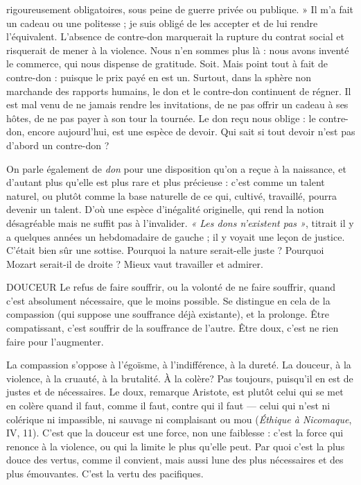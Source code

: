 rigoureusement obligatoires, sous peine de guerre privée ou publique. » Il m’a
fait un cadeau ou une politesse ; je suis obligé de les accepter et de lui rendre
l'équivalent. L'absence de contre-don marquerait la rupture du contrat social et
risquerait de mener à la violence. Nous n’en sommes plus là : nous avons
inventé le commerce, qui nous dispense de gratitude. Soit. Mais point tout à
fait de contre-don : puisque le prix payé en est un. Surtout, dans la sphère non
marchande des rapports humains, le don et le contre-don continuent de régner.
Il est mal venu de ne jamais rendre les invitations, de ne pas offrir un cadeau à
ses hôtes, de ne pas payer à son tour la tournée. Le don reçu nous oblige : le
contre-don, encore aujourd’hui, est une espèce de devoir. Qui sait si tout
devoir n’est pas d’abord un contre-don ?

On parle également de {\it don} pour une disposition qu’on a reçue à la naissance,
et d'autant plus qu’elle est plus rare et plus précieuse : c’est comme un
talent naturel, ou plutôt comme la base naturelle de ce qui, cultivé, travaillé,
pourra devenir un talent. D'où une espèce d’inégalité originelle, qui rend la
notion désagréable mais ne suffit pas à l’invalider. {\it « Les dons n'existent pas »},
titrait il y a quelques années un hebdomadaire de gauche ; il y voyait une leçon
de justice. C'était bien sûr une sottise. Pourquoi la nature serait-elle juste ?
Pourquoi Mozart serait-il de droite ? Mieux vaut travailler et admirer.

DOUCEUR Le refus de faire souffrir, ou la volonté de ne faire souffrir, quand
c’est absolument nécessaire, que le moins possible. Se distingue
en cela de la compassion (qui suppose une souffrance déjà existante), et la prolonge.
Être compatissant, c’est souffrir de la souffrance de l’autre. Être doux,
c’est ne rien faire pour l’augmenter.

La compassion s'oppose à l’égoïsme, à l'indifférence, à la dureté. La douceur,
à la violence, à la cruauté, à la brutalité. À la colère? Pas toujours,
puisqu'il en est de justes et de nécessaires. Le doux, remarque Aristote, est
plutôt celui qui se met en colère quand il faut, comme il faut, contre qui il faut
— celui qui n’est ni colérique ni impassible, ni sauvage ni complaisant ou mou
({\it Éthique à Nicomaque}, IV, 11). C’est que la douceur est une force, non une
faiblesse : c’est la force qui renonce à la violence, ou qui la limite le plus qu’elle
peut. Par quoi c’est la plus douce des vertus, comme il convient, mais aussi
lune des plus nécessaires et des plus émouvantes. C’est la vertu des pacifiques.

